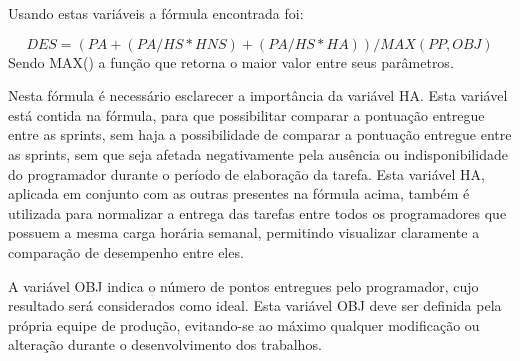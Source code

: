 Usando estas variáveis a fórmula encontrada foi:

\[
DES = (PA+(PA/HS*HNS)+(PA/HS*HA))/MAX(PP, OBJ)
\]
Sendo MAX() a função que retorna o maior valor entre seus parâmetros.

Nesta fórmula é necessário esclarecer a importância da variável HA. Esta variável está contida na fórmula, para que possibilitar comparar a pontuação entregue entre as sprints, sem haja a possibilidade de comparar a pontuação entregue entre as sprints, sem que seja afetada negativamente pela ausência ou indisponibilidade do programador durante o período de elaboração da tarefa. Esta variável HA, aplicada em conjunto com as outras presentes na fórmula acima, também é utilizada para normalizar a entrega das tarefas entre todos os programadores que possuem a mesma carga horária semanal, permitindo visualizar claramente a comparação de desempenho entre eles.\par
A variável OBJ indica o número de pontos entregues pelo programador, cujo resultado será considerados como ideal. Esta variável OBJ deve ser definida pela própria equipe de produção, evitando-se ao máximo qualquer modificação ou alteração durante o desenvolvimento dos trabalhos. 